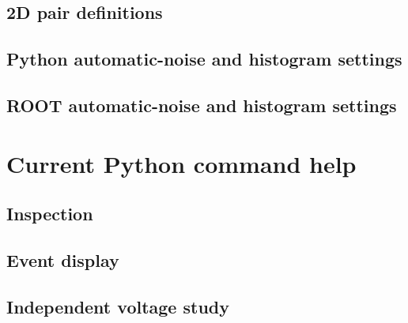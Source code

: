 \documentclass[11pt,a4paper]{article}
\begin{document}
\subsection{2D pair definitions}

\subsection{Python automatic-noise and histogram settings}

\subsection{ROOT automatic-noise and histogram settings}

\section{Current Python command help}
\subsection{Inspection}

\subsection{Event display}

\subsection{Independent voltage study}

\end{document}

